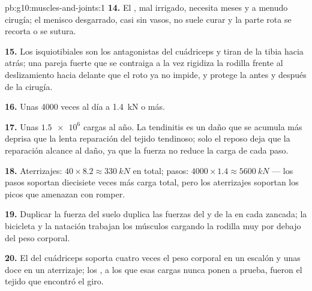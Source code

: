 \begin{solution}{pb:g10:muscles-and-joints:1}
\textbf{14.} El , mal irrigado, necesita meses y a menudo
cirugía; el menisco desgarrado,  casi sin vasos, no suele
curar y la parte rota se recorta o se sutura.

\textbf{15.} Los isquiotibiales son los antagonistas del cuádriceps y
tiran de la tibia hacia atrás; una pareja fuerte que se contraiga a la
vez rigidiza la rodilla frente al deslizamiento hacia delante que el
 roto ya no impide, y protege la  antes y después
de la cirugía.

\textbf{16.} Unas 4000 veces al día a \qty{1.4}{kN} o más.

\textbf{17.} Unas $\num{1.5e6}$ cargas al año. La tendinitis es un daño
que se acumula más deprisa que la lenta reparación del tejido
tendinoso; solo el reposo deja que la reparación alcance al daño, ya
que la fuerza no reduce la carga de cada paso.

\textbf{18.} Aterrizajes: $40 \times 8.2 \approx \qty{330}{kN}$ en
total; pasos: $4000 \times 1.4 \approx \qty{5600}{kN}$ --- los pasos
soportan diecisiete veces más carga total, pero los aterrizajes
soportan los picos que amenazan con romper.

\textbf{19.} Duplicar la fuerza del suelo duplica las fuerzas del
 y de la  en cada zancada; la bicicleta y la natación
trabajan los músculos cargando la rodilla muy por debajo del peso
corporal.

\textbf{20.} El  del cuádriceps soporta cuatro veces el peso
corporal en un escalón y unas doce en un aterrizaje; los , a
los que esas cargas nunca ponen a prueba, fueron el tejido que encontró
el giro.
\end{solution}
